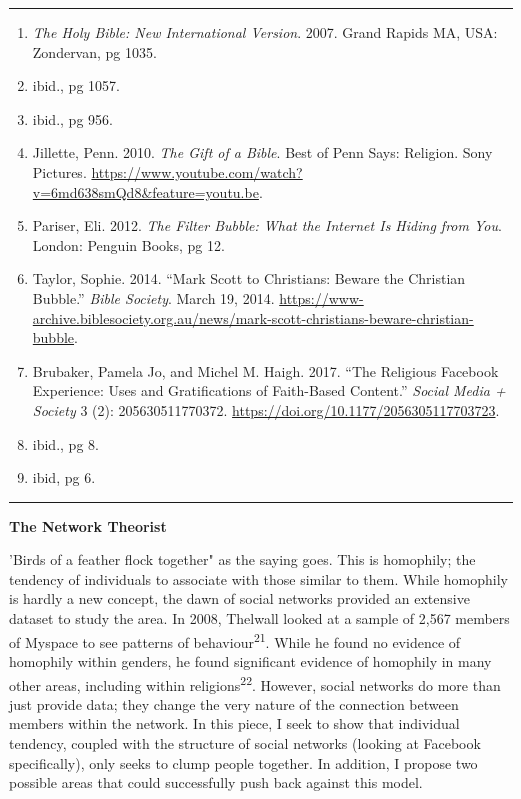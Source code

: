 \documentclass[]{article}
\providecommand{\tightlist}{%
  \setlength{\itemsep}{0pt}\setlength{\parskip}{0pt}}
\begin{document}
\begin{center}\rule{0.5\linewidth}{\linethickness}\end{center}

\begin{enumerate}
\def\labelenumi{\arabic{enumi}.}
\setcounter{enumi}{11}
\tightlist
\item
  \emph{The Holy Bible: New International Version}. 2007. Grand Rapids
  MA, USA: Zondervan, pg 1035.
\item
  ibid., pg 1057.
\item
  ibid., pg 956.
\item
  Jillette, Penn. 2010. \emph{The Gift of a Bible}. Best of Penn Says:
  Religion. Sony Pictures.
  \url{https://www.youtube.com/watch?v=6md638smQd8\&feature=youtu.be}.
\item
  Pariser, Eli. 2012. \emph{The Filter Bubble: What the Internet Is
  Hiding from You}. London: Penguin Books, pg 12.
\item
  Taylor, Sophie. 2014. ``Mark Scott to Christians: Beware the Christian
  Bubble.'' \emph{Bible Society}. March 19, 2014.
  \url{https://www-archive.biblesociety.org.au/news/mark-scott-christians-beware-christian-bubble}.
\item
  Brubaker, Pamela Jo, and Michel M. Haigh. 2017. ``The Religious
  Facebook Experience: Uses and Gratifications of Faith-Based Content.''
  \emph{Social Media + Society} 3 (2): 205630511770372.
  \url{https://doi.org/10.1177/2056305117703723}.
\item
  ibid., pg 8.
\item
  ibid, pg 6.
\end{enumerate}

\begin{center}\rule{0.5\linewidth}{\linethickness}\end{center}

\textbf{The Network Theorist}

'Birds of a feather flock together" as the saying goes. This is
homophily; the tendency of individuals to associate with those similar
to them. While homophily is hardly a new concept, the dawn of social
networks provided an extensive dataset to study the area. In 2008,
Thelwall looked at a sample of 2,567 members of Myspace to see patterns
of behaviour\textsuperscript{21}. While he found no evidence of
homophily within genders, he found significant evidence of homophily in
many other areas, including within religions\textsuperscript{22}.
However, social networks do more than just provide data; they change the
very nature of the connection between members within the network. In
this piece, I seek to show that individual tendency, coupled with the
structure of social networks (looking at Facebook specifically), only
seeks to clump people together. In addition, I propose two possible
areas that could successfully push back against this model.
\end{document}

